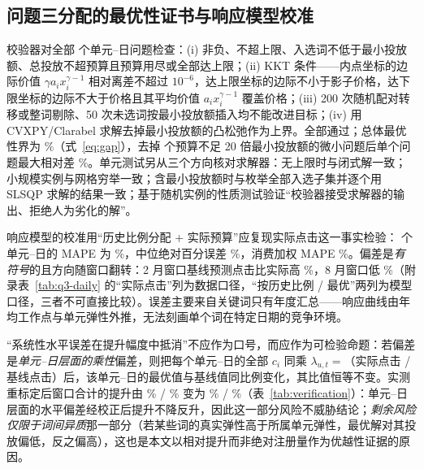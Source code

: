 \subsection{问题三分配的最优性证书与响应模型校准}
\label{sec:val-q3}
校验器对全部 \valQthreeAuditGroups{} 个单元--日问题检查：(i) 非负、不超上限、入选词不低于最小投放额、总投放不超预算且预算用尽或全部达上限；(ii) KKT 条件——内点坐标的边际价值 $\gamma a_ix_i^{\gamma-1}$ 相对离差不超过 $10^{-6}$，达上限坐标的边际不小于影子价格，达下限坐标的边际不大于价格且其平均价值 $a_ix_i^{\gamma-1}$ 覆盖价格；(iii) 200 次随机配对转移或整词剔除、50 次未选词按最小投放额插入均不能改进目标；(iv) 用 CVXPY/Clarabel 求解去掉最小投放额的凸松弛作为上界。全部通过；总体最优性界为 \valQthreeAggregateGapPct\%（式~\eqref{eq:gap}），去掉 \valQthreeCvxTinyGroups{} 个预算不足 20 倍最小投放额的微小问题后单个问题最大相对差 \valQthreeMaxCvxGapInformativePct\%。单元测试另从三个方向核对求解器：无上限时与闭式解一致；小规模实例与网格穷举一致；含最小投放额时与枚举全部入选子集并逐个用 SLSQP 求解的结果一致；基于随机实例的性质测试验证“校验器接受求解器的输出、拒绝人为劣化的解”。

响应模型的校准用“历史比例分配 + 实际预算”应复现实际点击这一事实检验：\valQthreeAuditGroups{} 个单元--日的 MAPE 为 \valQthreeCalibrationMape\%，中位绝对百分误差 \valQthreeCalibrationMedianApe\%，消费加权 MAPE \valQthreeSpendWeightedMape\%。偏差是\emph{有符号}的且方向随窗口翻转：2 月窗口基线预测点击比实际高 \valQthreeSignedBiasPctFeb\%，8 月窗口低 \valQthreeSignedBiasPctAug\%（附录表~\ref{tab:q3-daily} 的“实际点击”列为数据口径，“按历史比例 / 最优”两列为模型口径，三者不可直接比较）。误差主要来自关键词只有年度汇总——响应曲线由年均工作点与单元弹性外推，无法刻画单个词在特定日期的竞争环境。

“系统性水平误差在提升幅度中抵消”不应作为口号，而应作为可检验命题：若偏差是\emph{单元--日层面的乘性}偏差，则把每个单元--日的全部 $c_i$ 同乘 $\lambda_{u,t}=$（实际点击 / 基线点击）后，该单元--日的最优值与基线值同比例变化，其比值恒等不变。实测重标定后窗口合计的提升由 \valQthreeRegGainPctFeb\% / \valQthreeRegGainPctAug\% 变为 \valQthreeGainRescaledPctFeb\% / \valQthreeGainRescaledPctAug\%（表~\ref{tab:verification}）：单元--日层面的水平偏差经校正后提升不降反升，因此这一部分风险不威胁结论；\emph{剩余风险仅限于词间异质}那一部分（若某些词的真实弹性高于所属单元弹性，最优解对其投放偏低，反之偏高），这也是本文以相对提升而非绝对注册量作为优越性证据的原因。

